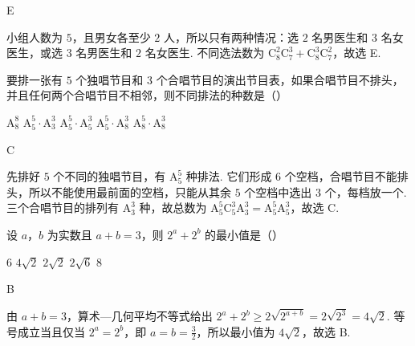 \documentclass[UTF8,a4paper,oneside,11pt]{ctexbook}
\begin{document}
\begin{answer}
E
\end{answer}

\begin{solution}
小组人数为 \(5\)，且男女各至少 \(2\) 人，所以只有两种情况：选 \(2\) 名男医生和 \(3\) 名女医生，或选 \(3\) 名男医生和 \(2\) 名女医生. 不同选法数为 \(\mathrm C_8^2\mathrm C_7^3+\mathrm C_8^3\mathrm C_7^2\)，故选 E.
\end{solution}

\begin{problem}

要排一张有 \(5\) 个独唱节目和 \(3\) 个合唱节目的演出节目表，如果合唱节目不排头，并且任何两个合唱节目不相邻，则不同排法的种数是（\quad）

\choicesfive
    {\(\mathrm A_8^8 \)}
    {\(\mathrm A_5^5\cdot \mathrm A_3^3 \)}
    {\(\mathrm A_5^5\cdot \mathrm A_5^3 \)}
    {\(\mathrm A_5^5\cdot \mathrm A_8^3 \)}
    {\(\mathrm A_8^5\cdot \mathrm A_8^3\)}
\end{problem}

\begin{answer}
C
\end{answer}

\begin{solution}
先排好 \(5\) 个不同的独唱节目，有 \(\mathrm A_5^5\) 种排法. 它们形成 \(6\) 个空档，合唱节目不能排头，所以不能使用最前面的空档，只能从其余 \(5\) 个空档中选出 \(3\) 个，每档放一个. 三个合唱节目的排列有 \(\mathrm A_3^3\) 种，故总数为 \(\mathrm A_5^5\mathrm C_5^3\mathrm A_3^3=\mathrm A_5^5\mathrm A_5^3\)，故选 C.
\end{solution}

\begin{problem}

设 \(a\)，\(b\) 为实数且 \(a + b = 3 \)，则 \(2^{a} + 2^{b} \) 的最小值是（\quad）

\choicesfive
    {\(6\)}
    {\(4\sqrt{2} \)}
    {\(2\sqrt{2} \)}
    {\(2\sqrt{6} \)}
    {\(8\)}
\end{problem}

\begin{answer}
B
\end{answer}

\begin{solution}
由 \(a+b=3\)，算术—几何平均不等式给出 \(2^a+2^b\geq2\sqrt{2^{a+b}}=2\sqrt{2^3}=4\sqrt{2}\). 等号成立当且仅当 \(2^a=2^b\)，即 \(a=b=\frac{3}{2}\)，所以最小值为 \(4\sqrt{2}\)，故选 B.
\end{solution}
\end{document}
